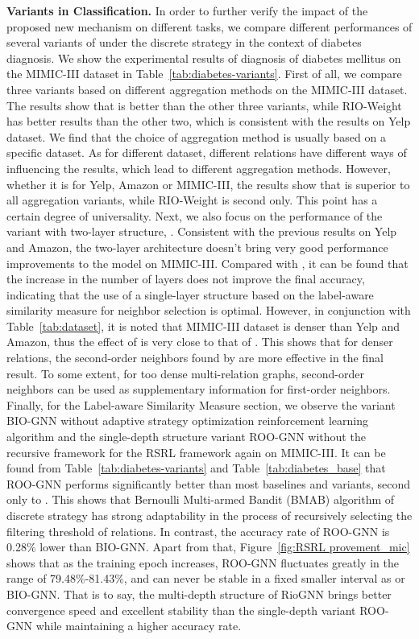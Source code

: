 \textbf{\RioGNN Variants in Classification.}
In order to further verify the impact of the proposed new mechanism on different tasks, we compare different performances of several variants of \RioGNN under the discrete strategy in the context of diabetes diagnosis. 
We show the experimental results of diagnosis of diabetes mellitus on the MIMIC-III dataset in Table~\ref{tab:diabetes-variants}.
First of all, we compare three variants based on different aggregation methods on the MIMIC-III dataset. 
The results show that \RioGNN is better than the other three variants, while RIO-Weight has better results than the other two, which is consistent with the results on Yelp dataset.
We find that the choice of aggregation method is usually based on a specific dataset. 
As for different dataset, different relations have different ways of influencing the results, which lead to different aggregation methods.
However, whether it is for Yelp, Amazon or MIMIC-III, the results show that \RioGNN is superior to all aggregation variants, while RIO-Weight is second only.
This point has a certain degree of universality.
Next, we also focus on the performance of the \RioGNN variant with two-layer structure, \RioGNN.
Consistent with the previous results on Yelp and Amazon, the two-layer architecture doesn't bring very good performance improvements to the model on MIMIC-III. 
Compared with \RioGNN, it can be found that the increase in the number of layers does not improve the final accuracy, indicating that the use of a single-layer structure based on the label-aware similarity measure for neighbor selection is optimal. 
However, in conjunction with Table~\ref{tab:dataset}, it is noted that MIMIC-III dataset is denser than Yelp and Amazon, thus the effect of \RioGNN is very close to that of \RioGNN. 
This shows that for denser relations, the second-order neighbors found by \RioGNN are more effective in the final result. 
To some extent, for too dense multi-relation graphs, second-order neighbors can be used as supplementary information for first-order neighbors.
Finally, for the Label-aware Similarity Measure section, we observe the variant BIO-GNN without adaptive strategy optimization reinforcement learning algorithm and the single-depth structure variant ROO-GNN without the recursive framework for the RSRL framework again on MIMIC-III. 
It can be found from Table~\ref{tab:diabetes-variants} and Table~\ref{tab:diabetes_base} that ROO-GNN performs significantly better than most baselines and variants, second only to \RioGNN. 
This shows that Bernoulli Multi-armed Bandit (BMAB) algorithm of discrete strategy has strong adaptability in the process of recursively selecting the filtering threshold of relations. 
In contrast, the accuracy rate of ROO-GNN is 0.28\% lower than BIO-GNN. 
Apart from that, Figure~\ref{fig:RSRL provement_mic} shows that as the training epoch increases, ROO-GNN fluctuates greatly in the range of 79.48\%-81.43\%, and can never be stable in a fixed smaller interval as \RioGNN or BIO-GNN. 
That is to say, the multi-depth structure of RioGNN brings better convergence speed and excellent stability than the single-depth variant ROO-GNN while maintaining a higher accuracy rate. 


